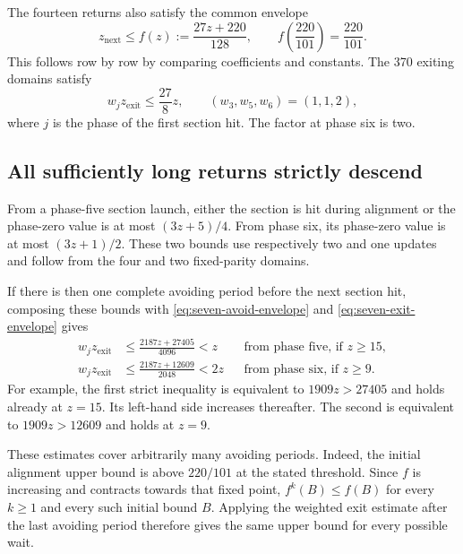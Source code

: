 The fourteen returns also satisfy the common envelope
\begin{equation}
 z_{\mathrm{next}}\le f(z):=\frac{27z+220}{128},
 \qquad f\left(\frac{220}{101}\right)=\frac{220}{101}.
 \label{eq:seven-avoid-envelope}
\end{equation}
This follows row by row by comparing coefficients and constants.
The 370 exiting domains satisfy
\begin{equation}
 w_j z_{\mathrm{exit}}\le\frac{27}{8}z,
 \qquad (w_3,w_5,w_6)=(1,1,2),
 \label{eq:seven-exit-envelope}
\end{equation}
where $j$ is the phase of the first section hit.  The factor at phase six is two.

\subsection{All sufficiently long returns strictly descend}

From a phase-five section launch, either the section is hit during
alignment or the phase-zero value is at most $(3z+5)/4$.  From phase
six, its phase-zero value is at most $(3z+1)/2$.  These two bounds use
respectively two and one updates and follow from the four and two
fixed-parity domains.

If there is then one complete avoiding period before the next section
hit, composing these bounds with \eqref{eq:seven-avoid-envelope} and
\eqref{eq:seven-exit-envelope} gives
\begin{align}
 w_jz_{\mathrm{exit}}
 &\le\frac{2187z+27405}{4096}<z
 &&\text{from phase five, if }z\ge15,\\
 w_jz_{\mathrm{exit}}
 &\le\frac{2187z+12609}{2048}<2z
 &&\text{from phase six, if }z\ge9.
 \label{eq:seven-long-bounds}
\end{align}
For example, the first strict inequality is equivalent to
$1909z>27405$ and holds already at $z=15$.  Its left-hand side
increases thereafter.  The second is equivalent to $1909z>12609$
and holds at $z=9$.

These estimates cover arbitrarily many avoiding periods.  Indeed,
the initial alignment upper bound is above $220/101$ at the stated
threshold.  Since $f$ is increasing and contracts towards that fixed
point, $f^k(B)\le f(B)$ for every $k\ge1$ and every such initial
bound $B$.  Applying the weighted exit estimate after the last avoiding
period therefore gives the same upper bound for every possible wait.

